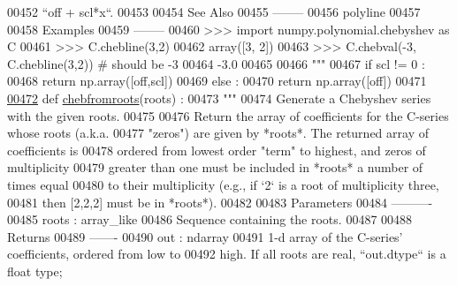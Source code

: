 \begin{DoxyCode}
00452 \textcolor{stringliteral}{        ``off + scl*x``.}
00453 \textcolor{stringliteral}{}
00454 \textcolor{stringliteral}{    See Also}
00455 \textcolor{stringliteral}{    --------}
00456 \textcolor{stringliteral}{    polyline}
00457 \textcolor{stringliteral}{}
00458 \textcolor{stringliteral}{    Examples}
00459 \textcolor{stringliteral}{    --------}
00460 \textcolor{stringliteral}{    >>> import numpy.polynomial.chebyshev as C}
00461 \textcolor{stringliteral}{    >>> C.chebline(3,2)}
00462 \textcolor{stringliteral}{    array([3, 2])}
00463 \textcolor{stringliteral}{    >>> C.chebval(-3, C.chebline(3,2)) # should be -3}
00464 \textcolor{stringliteral}{    -3.0}
00465 \textcolor{stringliteral}{}
00466 \textcolor{stringliteral}{    """}
00467     \textcolor{keywordflow}{if} scl != 0 :
00468         \textcolor{keywordflow}{return} np.array([off,scl])
00469     \textcolor{keywordflow}{else} :
00470         \textcolor{keywordflow}{return} np.array([off])
00471 
\hypertarget{chebyshev_8py_source_l00472}{}\hyperlink{namespacepyneb_1_1utils_1_1chebyshev_abedf5cf14ea9229321fc5e4043c42a0d}{00472} \textcolor{keyword}{def }\hyperlink{namespacepyneb_1_1utils_1_1chebyshev_abedf5cf14ea9229321fc5e4043c42a0d}{chebfromroots}(roots) :
00473     \textcolor{stringliteral}{"""}
00474 \textcolor{stringliteral}{    Generate a Chebyshev series with the given roots.}
00475 \textcolor{stringliteral}{}
00476 \textcolor{stringliteral}{    Return the array of coefficients for the C-series whose roots (a.k.a.}
00477 \textcolor{stringliteral}{    "zeros") are given by *roots*.  The returned array of coefficients is}
00478 \textcolor{stringliteral}{    ordered from lowest order "term" to highest, and zeros of multiplicity}
00479 \textcolor{stringliteral}{    greater than one must be included in *roots* a number of times equal}
00480 \textcolor{stringliteral}{    to their multiplicity (e.g., if `2` is a root of multiplicity three,}
00481 \textcolor{stringliteral}{    then [2,2,2] must be in *roots*).}
00482 \textcolor{stringliteral}{}
00483 \textcolor{stringliteral}{    Parameters}
00484 \textcolor{stringliteral}{    ----------}
00485 \textcolor{stringliteral}{    roots : array\_like}
00486 \textcolor{stringliteral}{        Sequence containing the roots.}
00487 \textcolor{stringliteral}{}
00488 \textcolor{stringliteral}{    Returns}
00489 \textcolor{stringliteral}{    -------}
00490 \textcolor{stringliteral}{    out : ndarray}
00491 \textcolor{stringliteral}{        1-d array of the C-series' coefficients, ordered from low to}
00492 \textcolor{stringliteral}{        high.  If all roots are real, ``out.dtype`` is a float type;}

\end{DoxyCode}
